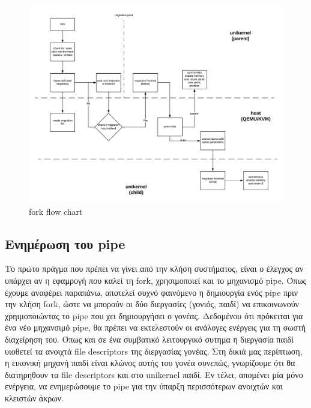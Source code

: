 \begin{figure}[htp]
\centerline{\includegraphics[scale=0.7]{figures/fork_olo.png}}
\caption{fork flow chart\label{fig4_8}}
\end{figure}

\subsection{Ενημέρωση του pipe}
Το πρώτο πράγμα που πρέπει να γίνει από την κλήση συστήματος, είναι ο έλεγχος αν
υπάρχει αν η εφαμρογή που καλεί τη fork, χρησιμοποιεί και το μηχανισμό pipe.
Όπως έχουμε αναφέρει
παραπάνω, αποτελεί συχνό φαινόμενο η δημιουργία ενός pipe πριν την κλήση fork,
ώστε να μπορούν οι δύο διεργασίες (γονιός, παιδί) να επικοινωνούν χρηιμοποιώντας
το pipe που χει δημιουργήσει ο γονέας. Δεδομένου ότι πρόκειται για ένα νέο
μηχανσιμό pipe, θα πρέπει να εκτελεστούν οι ανάλογες ενέργεις για τη σωστή
διαχείρηση του. Όπως και σε ένα συμβατικό λειτουργικό συτημα η διεργασία παιδί
υιοθετεί τα ανοιχτά file descriptors της διεργασίας γονέας. Στη δικιά μας
περίπτωση, η εικονική μηχανή παιδί είναι
κλώνος αυτής του γονέα συνεπώς, γνωρίζουμε ότι θα διατηρηθουν τα file descriptors
και στο unikernel παιδί. Εν τέλει, απομένει μία μόνο ενέργεια, να ενημερώσουμε το
pipe για την ύπαρξη περισσότερων ανοιχτών και κλειστών άκρων. 

